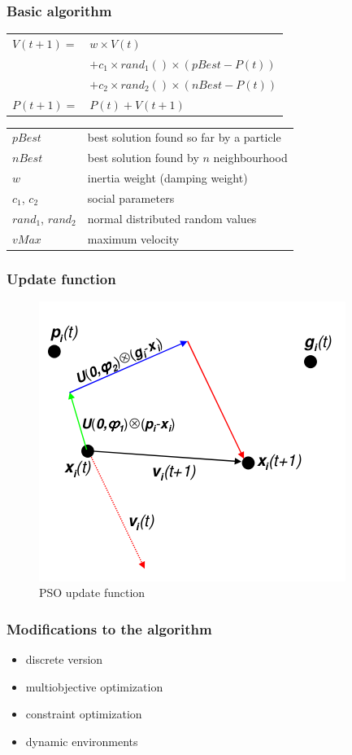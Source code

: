 \documentclass{beamer}
\begin{document}
\begin{frame}[fragile] 
  \frametitle{Basic algorithm}
  \begin{tabular}{ll}
    $V(t+1) =$ 	& $w \times V(t)$ \\
		& $+ c_{1} \times rand_{1}() \times (pBest - P(t))$ \\
		& $+ c_{2} \times rand_{2}()\times (nBest - P(t))$ \\
    $P(t+1) =$	& $P(t) + V(t+1)$ \\
  \end{tabular}

  \bigskip
  \begin{tabular}{ll}
    $pBest$		& best solution found so far by a particle \\
    $nBest$		& best solution found by $n$ neighbourhood \\
    $w$			& inertia weight (damping weight) \\
    $c_1$, $c_2$	& social parameters \\
    $rand_1$, $rand_2$	& normal distributed random values \\
    $vMax$		& maximum velocity \\
  \end{tabular}
\end{frame}

\begin{frame}[fragile]
  \frametitle{Update function}
  \begin{figure}
   \includegraphics[scale=0.5]{pso}
   \caption{PSO update function}
  \end{figure}
\end{frame}

\begin{frame}[fragile]
  \frametitle{Modifications to the algorithm}
  \begin{itemize}
    \item discrete version
    \item multiobjective optimization
    \item constraint optimization
    \item dynamic environments
  \end{itemize}
\end{frame}
\end{document}
